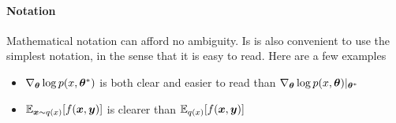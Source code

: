 \paragraph{Notation} Mathematical notation can afford no ambiguity. Is is also convenient to use the simplest notation, in the sense that it is easy to read. Here are a few examples
%
\begin{itemize}

    \item [] $\nabla_{{\bm{\theta}}} \log p(x, {\bm{\theta}}^*)$ is both clear and easier to read than $\nabla_{{\bm{\theta}}} \log p(x, {\bm{\theta}})|_{{\bm{\theta}}^*}$ 

    \item [] $\mathbb{E}_{{\bm{x}} \sim q(x)}[f({\bm{x}}, {\bm{y}})]$ is clearer than $\mathbb{E}_{q(x)}[f({\bm{x}}, {\bm{y}})]$
    
\end{itemize}


